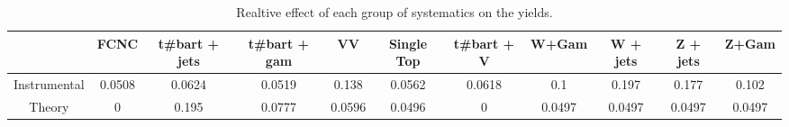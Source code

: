 \begin{table}[htbp]
\begin{center}
\begin{tabular}{|c|c|c|c|c|c|c|c|c|c|c|}
\hline 
      & FCNC      & t#bar{t} + jets      & t#bar{t} +  gam      & VV      & Single Top      & t#bar{t} + V      & W+Gam      & W + jets      & Z + jets      & Z+Gam \\ 
\hline 
 Instrumental & 0.0508 & 0.0624 & 0.0519 & 0.138 & 0.0562 & 0.0618 & 0.1 & 0.197 & 0.177 & 0.102 \\ 
 Theory & 0 & 0.195 & 0.0777 & 0.0596 & 0.0496 & 0 & 0.0497 & 0.0497 & 0.0497 & 0.0497 \\ 
\hline 
\end{tabular} 
\caption{Realtive effect of each group of systematics on the yields.} 
\end{center} 
\end{table} 

